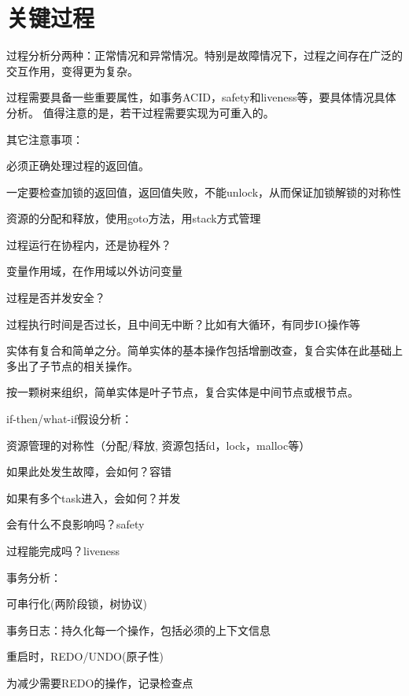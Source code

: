 \chapter{关键过程}

过程分析分两种：正常情况和异常情况。特别是故障情况下，过程之间存在广泛的交互作用，变得更为复杂。

过程需要具备一些重要属性，如事务ACID，safety和liveness等，要具体情况具体分析。
值得注意的是，若干过程需要实现为可重入的。

其它注意事项：
\begin{compactenum}
\item 必须正确处理过程的返回值。
\item 一定要检查加锁的返回值，返回值失败，不能unlock，从而保证加锁解锁的对称性
\item 资源的分配和释放，使用goto方法，用stack方式管理
\item 过程运行在协程内，还是协程外？
\item 变量作用域，在作用域以外访问变量
\item 过程是否并发安全？
\item 过程执行时间是否过长，且中间无中断？比如有大循环，有同步IO操作等
\end{compactenum}

实体有复合和简单之分。简单实体的基本操作包括增删改查，复合实体在此基础上多出了子节点的相关操作。

按一颗树来组织，简单实体是叶子节点，复合实体是中间节点或根节点。

if-then/what-if假设分析：
\begin{compactenum}
\item 资源管理的对称性（分配/释放, 资源包括fd，lock，malloc等）
\item 如果此处发生故障，会如何？容错
\item 如果有多个task进入，会如何？并发
\item 会有什么不良影响吗？safety
\item 过程能完成吗？liveness
\end{compactenum}

事务分析：
\begin{compactenum}
\item 可串行化(两阶段锁，树协议)
\item 事务日志：持久化每一个操作，包括必须的上下文信息
\item 重启时，REDO/UNDO(原子性)
\item 为减少需要REDO的操作，记录检查点
\end{compactenum}

